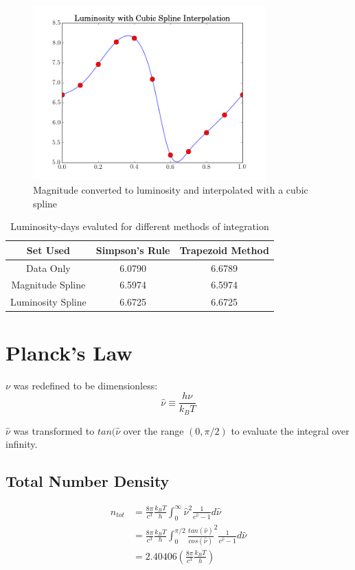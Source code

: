 \documentclass[12pt]{article}
\begin{document}
  \begin{figure}[h!]
    \centering
    \includegraphics[width=0.8\textwidth]{Problem3.png}
    \caption{Magnitude converted to luminosity and interpolated with a cubic spline}
  \end{figure}

  \begin{table}[h!]
  \centering
  \begin{tabular}{ | c | c | c |}
    \hline
    Set Used  & Simpson's Rule & Trapezoid Method \\ \hline
    Data Only         & 6.0790 & 6.6789 \\
    Magnitude Spline  & 6.5974 & 6.5974 \\
    Luminosity Spline & 6.6725 & 6.6725 \\ \hline
  \end{tabular}
  \caption{Luminosity-days evaluted for different methods of integration}
  \end{table}

  \section{Planck's Law}
  $\nu$ was redefined to be dimensionless:
  $$\hat{\nu} \equiv \frac{h\nu}{k_BT}$$
  
  $\hat{\nu}$ was transformed to $tan(\hat{\nu}$ over the range $(0,\pi/2)$ to
  evaluate the integral over infinity.

  \subsection{Total Number Density}

  \begin{align}
    n_{tot} &= \frac{8\pi}{c^3}\frac{k_BT}{h}\int^{\infty}_0\hat{\nu}^2\frac{1}{e^{\hat{\nu}}-1}d\hat{\nu}\nonumber\\
      &= \frac{8\pi}{c^3}\frac{k_BT}{h}\int^{\pi/2}_0\frac{tan(\hat{\nu})}{cos(\hat{\nu})}^2\frac{1}{e^{\hat{\nu}}-1}d\hat{\nu}\nonumber\\
      &=   2.40406 \left(\frac{8\pi}{c^3}\frac{k_BT}{h}\right) \nonumber
  \end{align}
\end{document}
